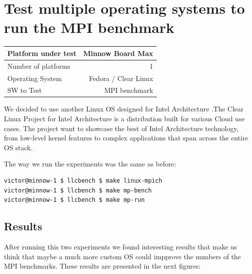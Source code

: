 \section{Test multiple operating systems to run the MPI benchmark}

    \begin{center}
    \begin{tabular}{ | l | r |}
        \hline
        Platform under test & Minnow Board  Max \\ \hline
        Number of platforms  & 1  \\ \hline
        Operating System & Fedora / Clear Linux  \\ \hline
        SW to Test & MPI benchmark \\ \hline
    \end{tabular}
     \label{Sanity Sumary}
    \end{center}


We decided to use another Linux OS designed for Intel Architecture
\cite{clear-linux}.The Clear Linux Project for Intel Architecture is a
distribution built for various Cloud use cases. The project  want to showcase
the best of Intel Architecture technology, from low-level kernel features to
complex applications that span across the entire OS stack.

The way we run the experiments was the same as before: 

\begin{lstlisting}[frame=single,language=bash]
victor@minnow-1 $ llcbench $ make linux-mpich
victor@minnow-1 $ llcbench $ make mp-bench
victor@minnow-1 $ llcbench $ make mp-run
\end{lstlisting}

\subsection{Results}

After running this two experiments we found interesting results that make us
think that maybe a much more custom OS could impprove the numbers of the MPI
benchmarks. These results are presented in the next figures:

